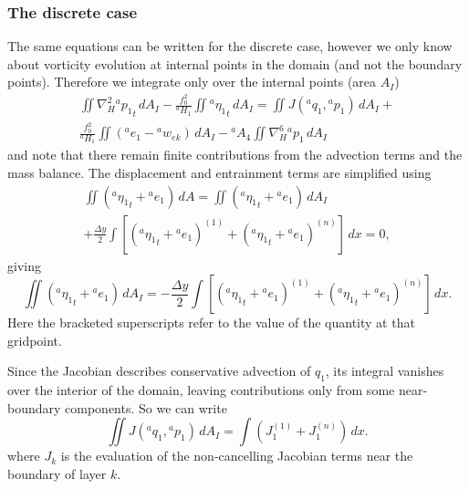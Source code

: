 \documentclass[11pt, a4paper,twoside]{article}
\newcommand{\etb}[2]{{{}^{#1}\eta_{#2}}}
\newcommand{\q}[2]{{{}^{#1}q_{#2}}}
\newcommand{\p}[2]{{{}^{#1}p_{#2}}}
\newcommand{\ek}[1]{{{}^{#1}w_{ek}}}
\newcommand{\HH}[2]{{{}^{#1}H_{#2}}}
\newcommand{\ah}[1]{{{}^{#1}A_4}}
\newcommand{\e}[2]{{{}^{#1}e_{#2}}}
\numberwithin{equation}{section}
\begin{document}
\subsubsection{The discrete case}\label{app:discon}
The same equations can be written for the discrete case, however we only know about vorticity evolution at internal points in the domain (and not the boundary points).
Therefore we integrate only over the internal points (area $A_I$)
\begin{multline}\label{eq:momnew}
\iint \nabla_H^2\p{a}{1}_t \, dA_I  - \frac{f_0^2}{\HH{a}{1}}\iint\etb{a}{1}_t \, dA_I = \iint J(\q{a}{1},\p{a}{1})\, dA_I  +\\
 \frac{f_0^2}{\HH{a}{1}}\iint (\e{a}{1} - \ek{a}) \, dA_I - \ah{a} \iint \nabla_H^6 \p{a}{1} \,dA_I
\end{multline}
and note that there remain finite contributions from the advection terms and the mass balance.
The displacement and entrainment terms are simplified using
\begin{multline}\label{eq:etae1}
\iint \left( \etb{a}{1}_t + \e{a}{1} \right) \, dA= \iint \left( \etb{a}{1}_t + \e{a}{1} \right) \, dA_I \\
+ \frac{\Delta y}{2}\int\left[\left( \etb{a}{1}_t + \e{a}{1} \right)^{(1)} + \left( \etb{a}{1}_t + \e{a}{1} \right)^{(n)}\right] \, dx = 0,
\end{multline}
giving
\begin{equation}
\iint \left( \etb{a}{1}_t + \e{a}{1} \right) \, dA_I = - \frac{\Delta y}{2}\int\left[\left( \etb{a}{1}_t + \e{a}{1} \right)^{(1)} + \left( \etb{a}{1}_t + \e{a}{1} \right)^{(n)}\right] \, dx.
\end{equation}
Here the bracketed superscripts refer to the value of the quantity at that gridpoint.

Since the Jacobian describes conservative advection of $q_1$, its integral vanishes over the interior of the domain, leaving contributions only from some near-boundary components.
So we can write
\begin{equation}\label{eq:jacat1}
\iint J(\q{a}{1},\p{a}{1})\, dA_I  = \int\left(J_1^{(1)} + J_1^{(n)} \right) \, dx.
\end{equation}
where $J_k$ is the evaluation of the non-cancelling Jacobian terms near the boundary of layer $k$.
\end{document}
